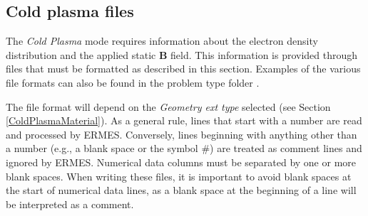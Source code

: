 \subsection{Cold plasma files}\label{ColdPlasmaFiles}

The \textit{Cold Plasma} mode requires information about the electron density distribution and the applied static \textbf{B} field. This information is provided through files that must be formatted as described in this section. Examples of the various file formats can also be found in the problem type folder .

The file format will depend on the \emph{Geometry ext type} selected (see Section \ref{ColdPlasmaMaterial}). As a general rule, lines that start with a number are read and processed by ERMES. Conversely, lines beginning with anything other than a number (e.g., a blank space or the symbol $\#$) are treated as comment lines and ignored by ERMES. Numerical data columns must be separated by one or more blank spaces. When writing these files, it is important to avoid blank spaces at the start of numerical data lines, as a blank space at the beginning of a line will be interpreted as a comment. 


